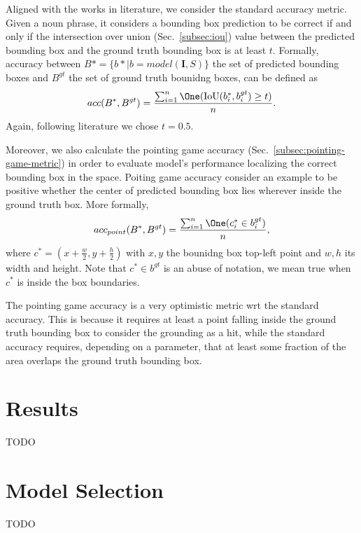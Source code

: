 Aligned with the works in literature, we consider the standard
accuracy metric. Given a noun phrase, it considers a bounding box
prediction to be correct if and only if the intersection over union
(Sec.~\ref{subsec:iou}) value between the predicted bounding box and
the ground truth bounding box is at least $t$. Formally, accuracy
between $B* = \{ b* | b = model(\bm{I}, S) \}$ the set of predicted
bounding boxes and $B^{gt}$ the set of ground truth bounidng boxes,
can be defined as
\[
  acc(B^*, B^{gt}) = \frac{\sum_{i = 1}^{n} \One (\iou (b_i^*, b_i^{gt}) \geq t)}{n}.
\]
Again, following literature we chose $t = 0.5$.

Moreover, we also calculate the pointing game accuracy
(Sec.~\ref{subsec:pointing-game-metric}) in order to evaluate model's
performance localizing the correct bounding box in the space. Poiting
game accuracy consider an example to be positive whether the center of
predicted bounding box lies wherever inside the ground truth box. More
formally,
\[
  acc_{point}(B^*, B^{gt}) = \frac{\sum_{i = 1}^{n} \One (c_i^* \in  b_i^{gt})}{n},
\]
where $c^* = (x + \frac{w}{2}, y + \frac{h}{2})$ with $x, y$ the
bounidng box top-left point and $w, h$ its width and height. Note that
$c^* \in b^{gt}$ is an abuse of notation, we mean true when $c^*$ is
inside the box boundaries.

The pointing game accuracy is a very optimistic metric wrt the
standard accuracy. This is because it requires at least a point
falling inside the ground truth bounding box to consider the grounding
as a hit, while the standard accuracy requires, depending on a
parameter, that at least some fraction of the area overlaps the ground
truth bounding box.

\section{Results}

TODO

\section{Model Selection}

TODO